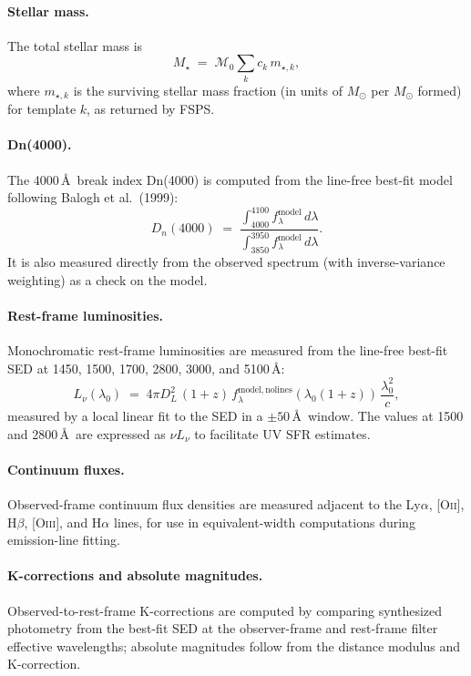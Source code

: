 \documentclass[12pt]{article}
\newcommand{\DL}{D_L}
\newcommand{\Msun}{M_{\odot}}
\newcommand{\flam}{f_\lambda}
\newcommand{\Mstar}{M_{\star}}
\newcommand{\C}{c}                 %
\begin{document}
\paragraph{Stellar mass.}
The total stellar mass is
\begin{equation}
  \Mstar \;=\; \mathcal{M}_0 \sum_k c_k\,m_{\star,k},
\end{equation}
where $m_{\star,k}$ is the surviving stellar mass fraction (in units of
$\Msun$ per $\Msun$ formed) for template $k$, as returned by FSPS.

\paragraph{Dn(4000).}
The 4000\,\AA\ break index Dn(4000) is computed from the line-free
best-fit model following Balogh et al.\ (1999):
\begin{equation}
  D_n(4000) \;=\;
  \frac{\int_{4000}^{4100}\!\flam^{\mathrm{model}}\,d\lambda}
       {\int_{3850}^{3950}\!\flam^{\mathrm{model}}\,d\lambda}.
\end{equation}
It is also measured directly from the observed spectrum (with inverse-variance
weighting) as a check on the model.

\paragraph{Rest-frame luminosities.}
Monochromatic rest-frame luminosities are measured from the line-free
best-fit SED at 1450, 1500, 1700, 2800, 3000, and 5100\,\AA:
\begin{equation}
  L_\nu(\lambda_0) \;=\;
  4\pi\DL^2\,(1+z)\,\flam^{\mathrm{model,nolines}}(\lambda_0(1+z))\,
  \frac{\lambda_0^2}{\C},
\end{equation}
measured by a local linear fit to the SED in a $\pm50$\,\AA\ window.
The values at 1500 and 2800\,\AA\ are expressed as $\nu L_\nu$ to facilitate
UV SFR estimates.

\paragraph{Continuum fluxes.}
Observed-frame continuum flux densities are measured adjacent to the
Ly$\alpha$, [O\textsc{ii}], H$\beta$, [O\textsc{iii}], and H$\alpha$ lines,
for use in equivalent-width computations during emission-line fitting.

\paragraph{K-corrections and absolute magnitudes.}
Observed-to-rest-frame K-corrections are computed by comparing synthesized
photometry from the best-fit SED at the observer-frame and rest-frame filter
effective wavelengths; absolute magnitudes follow from the distance modulus
and K-correction.
\end{document}
